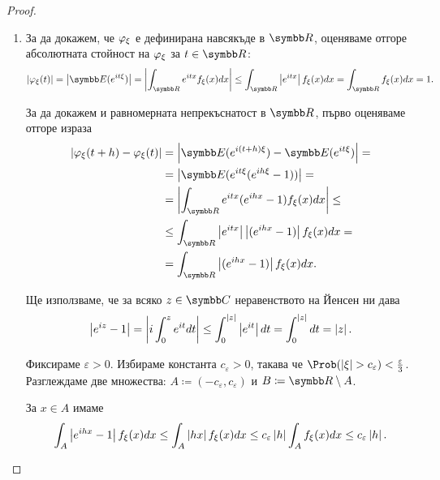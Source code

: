 \documentclass[numbers=endperiod, bibliography=totocnumbered]{scrartcl}
\begin{document}
\begin{proof}
  \mbox{}
  \begin{enumerate}
    \item За да докажем, че \( \varphi_\xi \) е дефинирана навсякъде в \( \R \), оценяваме отгоре абсолютната стойност на \( \varphi_\xi \) за \( t \in \R \):
    \begin{equation*}
      \Abs{\Char_\xi(t)}
      =
      \Abs{\Expect(e^{it\xi})}
      =
      \Abs{\int_{\R} e^{itx} f_\xi(x) dx}
      \leq
      \int_{\R} \Abs{e^{itx}} f_\xi(x) dx
      =
      \int_{\R} f_\xi(x) dx
      =
      1.
    \end{equation*}

    За да докажем и равномерната непрекъснатост в \( \R \), първо оценяваме отгоре израза
    \begin{align*}
      \Abs{\Char_\xi(t + h) - \Char_\xi(t)}
      &=
      \Abs{\Expect(e^{i(t + h)\xi}) - \Expect(e^{it\xi})}
      = \\ &=
      \Abs{\Expect(e^{it\xi} (e^{ih\xi} - 1))}
      = \\ &=
      \Abs{\int_{\R} e^{itx} (e^{ihx} - 1) f_\xi(x) dx}
      \leq \\ &\leq
      \int_{\R} \Abs{e^{itx}} \Abs{(e^{ihx} - 1)} f_\xi(x) dx
      = \\ &=
      \int_{\R} \Abs{(e^{ihx} - 1)} f_\xi(x) dx.
    \end{align*}

    Ще използваме, че за всяко \( z \in \Complex \) неравенството на Йенсен ни дава
    \begin{equation*}
      \left\vert e^{iz} - 1 \right\vert
      =
      \left\vert i \int_0^z e^{it} dt \right\vert
      \leq
      \int_0^{\left\vert z \right\vert} \left\vert e^{it} \right\vert dt
      =
      \int_0^{\left\vert z \right\vert} dt
      =
      \left\vert z \right\vert.
    \end{equation*}

    Фиксираме \( \varepsilon > 0 \). Избираме константа \( c_\varepsilon > 0 \), такава че \( \Prob(\Abs{\xi} > c_\varepsilon) < \frac \varepsilon 3 \).
    Разглеждаме две множества: \( A \coloneqq (-c_\varepsilon, c_\varepsilon) \) и \( B \coloneqq \R \setminus A \).

    За \( x \in A \) имаме
    \begin{equation*}
      \int_A \left\vert e^{ihx} - 1 \right\vert f_\xi(x) dx
      \leq
      \int_A \left\vert h x \right\vert f_\xi(x) dx
      \leq
      c_\varepsilon \left\vert h \right\vert \int_A f_\xi(x) dx
      \leq
      c_\varepsilon \left\vert h \right\vert.
    \end{equation*}


\end{enumerate}
\end{proof}
\end{document}
